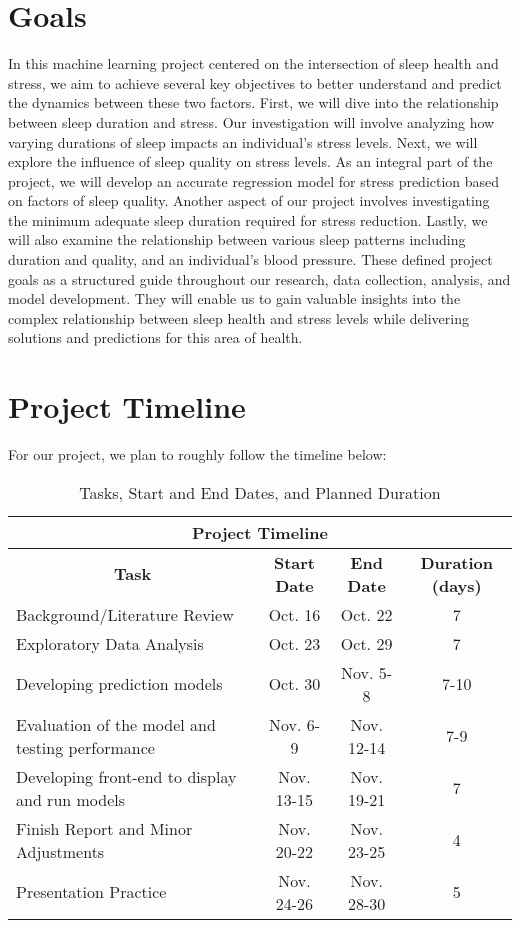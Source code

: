 \documentclass[11pt, letterpaper]{article}
\begin{document}
    \section*{Goals}
    In this machine learning project centered on the intersection of sleep health and stress, we aim to achieve several key objectives to better understand and predict the dynamics 
    between these two factors. First, we will dive into the relationship between sleep duration and stress. Our investigation will involve analyzing how varying durations of sleep 
    impacts an individual's stress levels. Next, we will explore the influence of sleep quality on stress levels. As an integral part of the project, we will develop an accurate 
    regression model for stress prediction based on factors of sleep quality. Another aspect of our project involves investigating the minimum adequate sleep duration required 
    for stress reduction. Lastly, we will also examine the relationship between various sleep patterns including duration and quality, and an individual's blood pressure. These 
    defined project goals as a structured guide throughout our research, data collection, analysis, and model development. They will enable us to gain valuable insights into the 
    complex relationship between sleep health and stress levels while delivering solutions and predictions for this area of health.

    \section*{Project Timeline}
    For our project, we plan to roughly follow the timeline below:

    \begin{table}[h]
        \centering
        \begin{tabular}{l|c|c|c}
            \hline \hline
            \multicolumn{4}{c}{\textbf{Project Timeline}} \\
            \hline \hline
            \multicolumn{1}{c|}{\textbf{Task}} & \textbf{Start Date} & \textbf{End Date} & \textbf{Duration (days)} \\
            \hline
            Background/Literature Review & Oct. 16 & Oct. 22 & 7 \\
            \hline
            Exploratory Data Analysis & Oct. 23 & Oct. 29 & 7 \\
            \hline
            Developing prediction models & Oct. 30 & Nov. 5-8 & 7-10 \\
            \hline
            Evaluation of the model and testing performance & Nov. 6-9 & Nov. 12-14 & 7-9 \\
            \hline
            Developing front-end to display and run models & Nov. 13-15 & Nov. 19-21 & 7 \\
            \hline
            Finish Report and Minor Adjustments & Nov. 20-22 & Nov. 23-25 & 4 \\
            \hline
            Presentation Practice & Nov. 24-26 & Nov. 28-30 & 5 \\
            \hline \hline
        \end{tabular}
        \caption{Tasks, Start and End Dates, and Planned Duration}
        \label{tab:timeline}
    \end{table}
\end{document}
